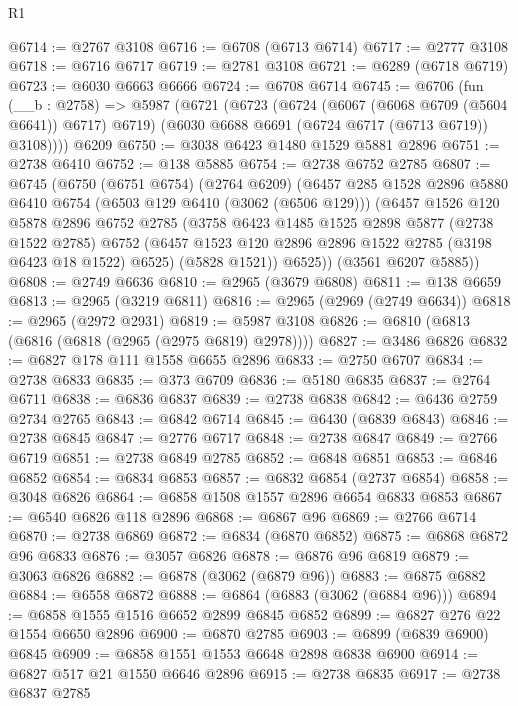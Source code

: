 \begin{lexlean}{R1}
\begin{coremodule}
@6714 := @2767 @3108
@6716 := @6708 (@6713 @6714)
@6717 := @2777 @3108
@6718 := @6716 @6717
@6719 := @2781 @3108
@6721 := @6289 (@6718 @6719)
@6723 := @6030 @6663 @6666
@6724 := @6708 @6714
@6745 := @6706
    (fun (__b : @2758) =>
    @5987
      (@6721
        (@6723
          (@6724 (@6067 (@6068 @6709 (@5604 @6641)) @6717) @6719)
          (@6030 @6688 @6691 (@6724 @6717 (@6713 @6719)) @3108))))
    @6209
@6750 := @3038 @6423 @1480 @1529 @5881 @2896
@6751 := @2738 @6410
@6752 := @138 @5885
@6754 := @2738 @6752 @2785
@6807 := @6745
    (@6750
      (@6751 @6754)
      (@2764 @6209)
      (@6457
        @285
        @1528
        @2896
        @5880
        @6410
        @6754
        (@6503 @129 @6410 (@3062 (@6506 @129)))
        (@6457
          @1526
          @120
          @5878
          @2896
          @6752
          @2785
          (@3758
            @6423
            @1485
            @1525
            @2898
            @5877
            (@2738 @1522 @2785)
            @6752
            (@6457 @1523 @120 @2896 @2896 @1522 @2785 (@3198 @6423 @18 @1522) @6525)
            (@5828 @1521))
          @6525))
      (@3561 @6207 @5885))
@6808 := @2749 @6636
@6810 := @2965 (@3679 @6808)
@6811 := @138 @6659
@6813 := @2965 (@3219 @6811)
@6816 := @2965 (@2969 (@2749 @6634))
@6818 := @2965 (@2972 @2931)
@6819 := @5987 @3108
@6826 := @6810 (@6813 (@6816 (@6818 (@2965 (@2975 @6819) @2978))))
@6827 := @3486 @6826
@6832 := @6827 @178 @111 @1558 @6655 @2896
@6833 := @2750 @6707
@6834 := @2738 @6833
@6835 := @373 @6709
@6836 := @5180 @6835
@6837 := @2764 @6711
@6838 := @6836 @6837
@6839 := @2738 @6838
@6842 := @6436 @2759 @2734 @2765
@6843 := @6842 @6714
@6845 := @6430 (@6839 @6843)
@6846 := @2738 @6845
@6847 := @2776 @6717
@6848 := @2738 @6847
@6849 := @2766 @6719
@6851 := @2738 @6849 @2785
@6852 := @6848 @6851
@6853 := @6846 @6852
@6854 := @6834 @6853
@6857 := @6832 @6854 (@2737 @6854)
@6858 := @3048 @6826
@6864 := @6858 @1508 @1557 @2896 @6654 @6833 @6853
@6867 := @6540 @6826 @118 @2896
@6868 := @6867 @96
@6869 := @2766 @6714
@6870 := @2738 @6869
@6872 := @6834 (@6870 @6852)
@6875 := @6868 @6872 @96 @6833
@6876 := @3057 @6826
@6878 := @6876 @96 @6819
@6879 := @3063 @6826
@6882 := @6878 (@3062 (@6879 @96))
@6883 := @6875 @6882
@6884 := @6558 @6872
@6888 := @6864 (@6883 (@3062 (@6884 @96)))
@6894 := @6858 @1555 @1516 @6652 @2899 @6845 @6852
@6899 := @6827 @276 @22 @1554 @6650 @2896
@6900 := @6870 @2785
@6903 := @6899 (@6839 @6900) @6845
@6909 := @6858 @1551 @1553 @6648 @2898 @6838 @6900
@6914 := @6827 @517 @21 @1550 @6646 @2896
@6915 := @2738 @6835
@6917 := @2738 @6837 @2785

\end{coremodule}
\end{lexlean}
